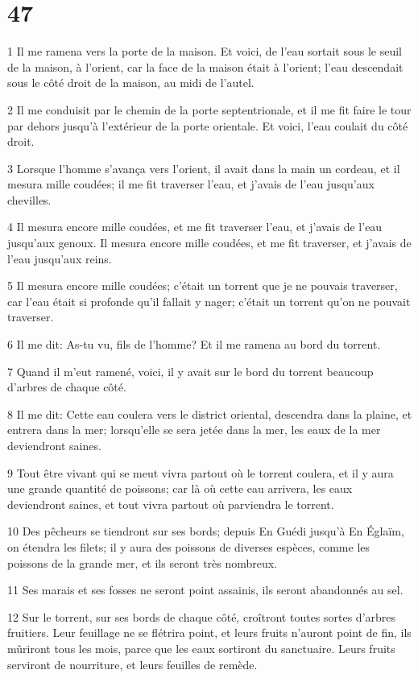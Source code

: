 \chapter{47}

\par 1 Il me ramena vers la porte de la maison. Et voici, de l'eau sortait sous le seuil de la maison, à l'orient, car la face de la maison était à l'orient; l'eau descendait sous le côté droit de la maison, au midi de l'autel.
\par 2 Il me conduisit par le chemin de la porte septentrionale, et il me fit faire le tour par dehors jusqu'à l'extérieur de la porte orientale. Et voici, l'eau coulait du côté droit.
\par 3 Lorsque l'homme s'avança vers l'orient, il avait dans la main un cordeau, et il mesura mille coudées; il me fit traverser l'eau, et j'avais de l'eau jusqu'aux chevilles.
\par 4 Il mesura encore mille coudées, et me fit traverser l'eau, et j'avais de l'eau jusqu'aux genoux. Il mesura encore mille coudées, et me fit traverser, et j'avais de l'eau jusqu'aux reins.
\par 5 Il mesura encore mille coudées; c'était un torrent que je ne pouvais traverser, car l'eau était si profonde qu'il fallait y nager; c'était un torrent qu'on ne pouvait traverser.
\par 6 Il me dit: As-tu vu, fils de l'homme? Et il me ramena au bord du torrent.
\par 7 Quand il m'eut ramené, voici, il y avait sur le bord du torrent beaucoup d'arbres de chaque côté.
\par 8 Il me dit: Cette eau coulera vers le district oriental, descendra dans la plaine, et entrera dans la mer; lorsqu'elle se sera jetée dans la mer, les eaux de la mer deviendront saines.
\par 9 Tout être vivant qui se meut vivra partout où le torrent coulera, et il y aura une grande quantité de poissons; car là où cette eau arrivera, les eaux deviendront saines, et tout vivra partout où parviendra le torrent.
\par 10 Des pêcheurs se tiendront sur ses bords; depuis En Guédi jusqu'à En Églaïm, on étendra les filets; il y aura des poissons de diverses espèces, comme les poissons de la grande mer, et ils seront très nombreux.
\par 11 Ses marais et ses fosses ne seront point assainis, ils seront abandonnés au sel.
\par 12 Sur le torrent, sur ses bords de chaque côté, croîtront toutes sortes d'arbres fruitiers. Leur feuillage ne se flétrira point, et leurs fruits n'auront point de fin, ils mûriront tous les mois, parce que les eaux sortiront du sanctuaire. Leurs fruits serviront de nourriture, et leurs feuilles de remède.

